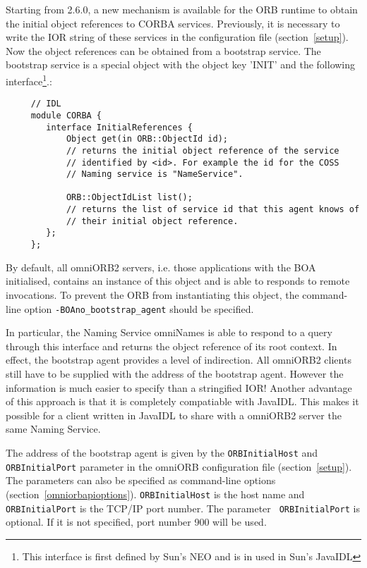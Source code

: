 \documentclass[11pt,twoside,onecolumn]{book}
\begin{document}
Starting from 2.6.0, a new mechanism is available for the ORB runtime to
obtain the initial object references to CORBA services. Previously, it is
necessary to write the IOR string of these services in the configuration
file (section~\ref{setup}). Now the object references can be obtained from
a bootstrap service. The bootstrap service is a special object with the
object key 'INIT' and the following interface\footnote{This interface is
first defined by Sun's NEO and is in used in Sun's JavaIDL}.:

{
\small
\begin{verbatim}
     // IDL
     module CORBA {
        interface InitialReferences {
            Object get(in ORB::ObjectId id);
            // returns the initial object reference of the service
            // identified by <id>. For example the id for the COSS
            // Naming service is "NameService".

            ORB::ObjectIdList list();
            // returns the list of service id that this agent knows of
            // their initial object reference.
        };
     };
\end{verbatim}
}

By default, all omniORB2 servers, i.e. those applications with the BOA
initialised, contains an instance of this object and is able to responds to
remote invocations. To prevent the ORB from instantiating this object, the
command-line option {\tt -BOAno\_bootstrap\_agent} should be specified.

In particular, the Naming Service omniNames is able to respond to a query
through this interface and returns the object reference of its root
context. In effect, the bootstrap agent provides a level of indirection.
All omniORB2 clients still have to be supplied with the address of the
bootstrap agent. However the information is much easier to specify than a
stringified IOR! Another advantage of this approach is that it is
completely compatiable with JavaIDL. This makes it possible for a client
written in JavaIDL to share with a omniORB2 server the same Naming Service.

The address of the bootstrap agent is given by the {\tt ORBInitialHost} and
{\tt ORBInitialPort} parameter in the omniORB configuration file
(section~\ref{setup}). The parameters can also be specified as command-line
options (section~\ref{omniorbapioptions}). {\tt ORBInitialHost} is the host
name and {\tt ORBInitialPort} is the TCP/IP port number. The parameter {\tt
ORBInitialPort} is optional. If it is not specified, port number 900 will
be used. 
\end{document}

